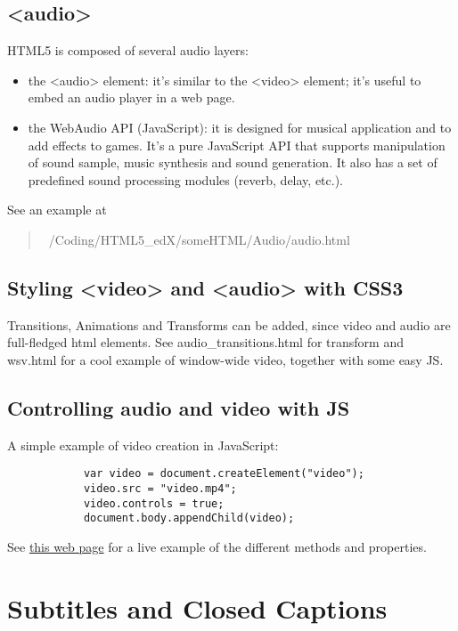 \documentclass[a4paper,11pt]{book}
\begin{document}
        \subsection{<audio>}
        HTML5 is composed of several audio layers:
        \begin{itemize}
            \item the <audio> element: it's similar to the <video> element; it's useful to embed an audio player in a web page.
            \item the WebAudio API (JavaScript): 
            it is designed for musical application and to add effects to games. It's a pure JavaScript
            API that supports manipulation of sound sample, music synthesis and sound generation. It also has a set of
            predefined sound processing modules (reverb, delay, etc.).
        \end{itemize}
        See an example at
        \begin{verse}
        ~/Coding/HTML5\_edX/someHTML/Audio/audio.html
        \end{verse}

        \subsection{Styling <video> and <audio> with CSS3}
        Transitions, Animations and Transforms can be added, since video and audio are full-fledged html elements.
        See audio\_transitions.html for transform and wsv.html for a cool example of window-wide video, together with some easy JS.

        \subsection{Controlling audio and video with JS}
        A simple example of video creation in JavaScript:
        \begin{verbatim}
            var video = document.createElement("video");
            video.src = "video.mp4";
            video.controls = true;
            document.body.appendChild(video);
        \end{verbatim}
        See \href{http://www.w3.org/2010/05/video/mediaevents.html}{this web page} for a live example of the different methods and
        properties.

\section{Subtitles and Closed Captions}
\end{document}
